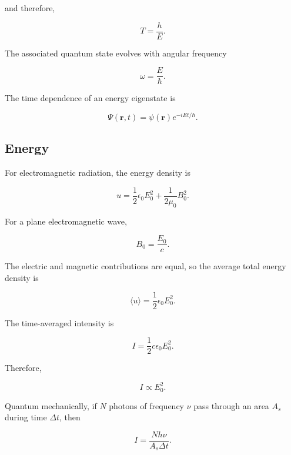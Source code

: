 \documentclass[12pt]{article}
\begin{document}
and therefore,

\begin{equation}
\boxed{T=\frac{h}{E}}.
\end{equation}

The associated quantum state evolves with angular frequency

\begin{equation}
\omega=\frac{E}{\hbar}.
\end{equation}

The time dependence of an energy eigenstate is

\begin{equation}
\Psi(\mathbf{r},t)=\psi(\mathbf{r})e^{-iEt/\hbar}.
\end{equation}

\subsection{Energy}

For electromagnetic radiation, the energy density is

\begin{equation}
u=\frac{1}{2}\epsilon_0 E_0^2+\frac{1}{2\mu_0}B_0^2.
\end{equation}

For a plane electromagnetic wave,

\begin{equation}
B_0=\frac{E_0}{c}.
\end{equation}

The electric and magnetic contributions are equal, so the average total energy density is

\begin{equation}
\langle u\rangle=\frac{1}{2}\epsilon_0 E_0^2.
\end{equation}

The time-averaged intensity is

\begin{equation}
\boxed{I=\frac{1}{2}c\epsilon_0 E_0^2}.
\end{equation}

Therefore,

\begin{equation}
I\propto E_0^2.
\end{equation}

Quantum mechanically, if $N$ photons of frequency $\nu$ pass through an area $A_s$ during time $\Delta t$, then

\begin{equation}
I=\frac{Nh\nu}{A_s\Delta t}.
\end{equation}
\end{document}
